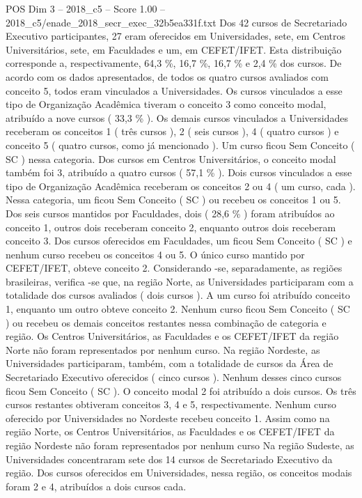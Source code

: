 \begin{textsample}{POS Dim 3 – 2018\_c5 – Score 1.00 – 2018\_c5/enade\_2018\_secr\_exec\_32b5ea331f.txt}
Dos 42 cursos de Secretariado Executivo participantes, 27 eram oferecidos em Universidades, sete, em Centros Universitários, sete, em Faculdades e um, em CEFET/IFET.
Esta distribuição corresponde a, respectivamente, 64,3 \%, 16,7 \%, 16,7 \% e 2,4 \% dos cursos.
De acordo com os dados apresentados, de todos os quatro cursos avaliados com conceito 5, todos eram vinculados a Universidades.
Os cursos vinculados a esse tipo de Organização Acadêmica tiveram o conceito 3 como conceito modal, atribuído a nove cursos ( 33,3 \% ).
Os demais cursos vinculados a Universidades receberam os conceitos 1 ( três cursos ), 2 ( seis cursos ), 4 ( quatro cursos ) e conceito 5 ( quatro cursos, como já mencionado ).
Um curso ficou Sem Conceito ( SC ) nessa categoria.
Dos cursos em Centros Universitários, o conceito modal também foi 3, atribuído a quatro cursos ( 57,1 \% ).
Dois cursos vinculados a esse tipo de Organização Acadêmica receberam os conceitos 2 ou 4 ( um curso, cada ).
Nessa categoria, um ficou Sem Conceito ( SC ) ou recebeu os conceitos 1 ou 5.
Dos seis cursos mantidos por Faculdades, dois ( 28,6 \% ) foram atribuídos ao conceito 1, outros dois receberam conceito 2, enquanto outros dois receberam conceito 3.
Dos cursos oferecidos em Faculdades, um ficou Sem Conceito ( SC ) e nenhum curso recebeu os conceitos 4 ou 5.
O único curso mantido por CEFET/IFET, obteve conceito 2.
Considerando -se, separadamente, as regiões brasileiras, verifica -se que, na região Norte, as Universidades participaram com a totalidade dos cursos avaliados ( dois cursos ).
A um curso foi atribuído conceito 1, enquanto um outro obteve conceito 2.
Nenhum curso ficou Sem Conceito ( SC ) ou recebeu os demais conceitos restantes nessa combinação de categoria e região.
Os Centros Universitários, as Faculdades e os CEFET/IFET da região Norte não foram representados por nenhum curso.
Na região Nordeste, as Universidades participaram, também, com a totalidade de cursos da Área de Secretariado Executivo oferecidos ( cinco cursos ).
Nenhum desses cinco cursos ficou Sem Conceito ( SC ).
O conceito modal 2 foi atribuído a dois cursos.
Os três cursos restantes obtiveram conceitos 3, 4 e 5, respectivamente.
Nenhum curso oferecido por Universidades no Nordeste recebeu conceito 1.
Assim como na região Norte, os Centros Universitários, as Faculdades e os CEFET/IFET da região Nordeste não foram representados por nenhum curso Na região Sudeste, as Universidades concentraram sete dos 14 cursos de Secretariado Executivo da região.
Dos cursos oferecidos em Universidades, nessa região, os conceitos modais foram 2 e 4, atribuídos a dois cursos cada.

\end{textsample}
